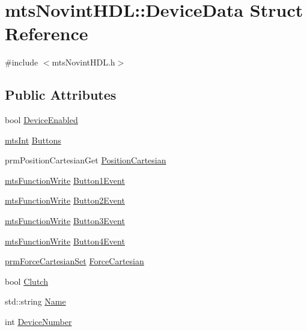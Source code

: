 \hypertarget{structmts_novint_h_d_l_1_1_device_data}{}\section{mts\+Novint\+H\+D\+L\+:\+:Device\+Data Struct Reference}
\label{structmts_novint_h_d_l_1_1_device_data}


{\ttfamily \#include $<$mts\+Novint\+H\+D\+L.\+h$>$}

\subsection*{Public Attributes}
\begin{DoxyCompactItemize}
\item 
bool \hyperlink{structmts_novint_h_d_l_1_1_device_data_afb160710dea5b05f05d1aab53d92336f}{Device\+Enabled}
\item 
\hyperlink{mts_generic_object_proxy_8h_a24374d6f6591267740de73ba87c08d4e}{mts\+Int} \hyperlink{structmts_novint_h_d_l_1_1_device_data_ac44990640b586d8a73e6f75d7c009ca9}{Buttons}
\item 
prm\+Position\+Cartesian\+Get \hyperlink{structmts_novint_h_d_l_1_1_device_data_ac93b06cca79ba9eeb52df9d2f0931276}{Position\+Cartesian}
\item 
\hyperlink{classmts_function_write}{mts\+Function\+Write} \hyperlink{structmts_novint_h_d_l_1_1_device_data_a59318180ca7f85b1f17fa587d123b432}{Button1\+Event}
\item 
\hyperlink{classmts_function_write}{mts\+Function\+Write} \hyperlink{structmts_novint_h_d_l_1_1_device_data_a0f3d63effcb0c47a8936f07bc2cb21ba}{Button2\+Event}
\item 
\hyperlink{classmts_function_write}{mts\+Function\+Write} \hyperlink{structmts_novint_h_d_l_1_1_device_data_a82bf93fa265ffd336ae0c9947cf5fec1}{Button3\+Event}
\item 
\hyperlink{classmts_function_write}{mts\+Function\+Write} \hyperlink{structmts_novint_h_d_l_1_1_device_data_afb4f5d57acac4ff03d0e6c7ce0f8c637}{Button4\+Event}
\item 
\hyperlink{classprm_force_cartesian_set}{prm\+Force\+Cartesian\+Set} \hyperlink{structmts_novint_h_d_l_1_1_device_data_a0cdc951bd1b42f4f2d600edf415ba181}{Force\+Cartesian}
\item 
bool \hyperlink{structmts_novint_h_d_l_1_1_device_data_a00c1d32b2e1ae4603014566a61b18eb6}{Clutch}
\item 
std\+::string \hyperlink{structmts_novint_h_d_l_1_1_device_data_a680dd117f9b6f0b13ef2142d72c507ff}{Name}
\item 
int \hyperlink{structmts_novint_h_d_l_1_1_device_data_a9bd1b2ab0ac17be34d64b2ad1de156a2}{Device\+Number}
\end{DoxyCompactItemize}



